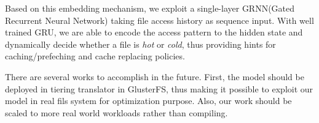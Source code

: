\documentclass[conference]{IEEEtran}
\begin{document}
Based on this embedding mechanism, we exploit a single-layer GRNN(Gated Recurrent Neural Network) taking file access history as sequence input.
With well trained GRU, we are able to encode the access pattern to the hidden state and dynamically decide whether a file is \textit{hot} or \textit{cold},
thus providing hints for caching/prefeching and cache replacing policies.

There are several works to accomplish in the future. First, the model should be deployed in tiering translator in GlusterFS,
thus making it possible to exploit our model in real fils system for optimization purpose. 
Also, our work should be scaled to more real world workloads rather than compiling.


\end{document}
